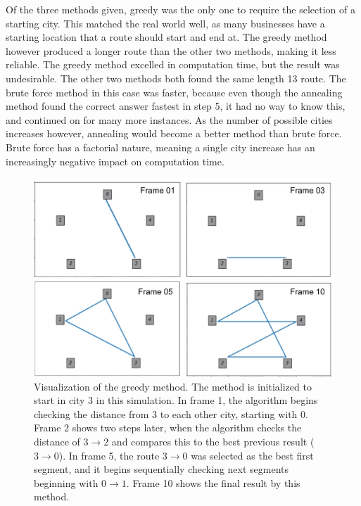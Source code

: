 \documentclass[twocolumn]{article}
\begin{document}
Of the three methods given, greedy was the only one to require the selection of a starting city. This matched the real world well, as many businesses have a starting location that a route should start and end at. The greedy method however produced a longer route than the other two methods, making it less reliable. The greedy method excelled in computation time, but the result was undesirable. The other two methods both found the same length 13 route. The brute force method in this case was faster, because even though the annealing method found the correct answer fastest in step 5, it had no way to know this, and continued on for many more instances. As the number of possible cities increases however, annealing would become a better method than brute force. Brute force has a factorial nature, meaning a single city increase has an increasingly negative impact on computation time.

\begin{figure}
\centering
\includegraphics[width=\linewidth]{greedy_4frames}
\caption{Visualization of the greedy method. The method is initialized to start in city 3 in this simulation. In frame 1, the algorithm begins checking the distance from 3 to each other city, starting with 0. Frame 2 shows two steps later, when the algorithm checks the distance of $3 \to 2$ and compares this to the best previous result ($3 \to 0$). In frame 5, the route $3 \to 0$  was selected as the best first segment, and it begins sequentially checking next segments beginning with $0 \to 1$. Frame 10 shows the final result by this method.}
\label{fig:greedy_4frames}
\end{figure}
\end{document}

